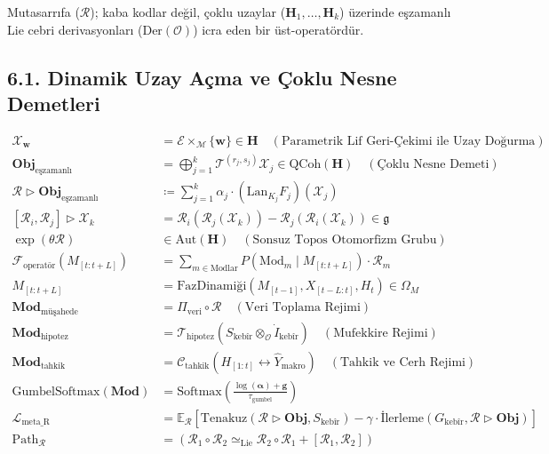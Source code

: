 \documentclass[11pt, a4paper]{article}
\begin{document}
Mutasarrıfa ($\mathcal{R}$); kaba kodlar değil, çoklu uzaylar ($\mathbf{H}_1, \dots, \mathbf{H}_k$) üzerinde eşzamanlı Lie cebri derivasyonları ($\text{Der}(\mathcal{O})$) icra eden bir üst-operatördür.

\subsection{6.1. Dinamik Uzay Açma ve Çoklu Nesne Demetleri}
\begin{align}
\mathcal{X}_{\mathbf{w}} &= \mathcal{E} \times_{\mathcal{M}} \{\mathbf{w}\} \in \mathbf{H} \quad (\text{Parametrik Lif Geri-Çekimi ile Uzay Doğurma}) \\
\mathbf{Obj}_{\text{eşzamanlı}} &= \bigoplus_{j=1}^k \mathcal{T}^{(r_j, s_j)} \mathcal{X}_j \in \text{QCoh}(\mathbf{H}) \quad (\text{Çoklu Nesne Demeti}) \\
\mathcal{R} \triangleright \mathbf{Obj}_{\text{eşzamanlı}} &\coloneqq \sum_{j=1}^k \alpha_j \cdot \left( \text{Lan}_{K_j} F_j \right)(\mathcal{X}_j) \\
[\mathcal{R}_i, \mathcal{R}_j] \triangleright \mathcal{X}_k &= \mathcal{R}_i(\mathcal{R}_j(\mathcal{X}_k)) - \mathcal{R}_j(\mathcal{R}_i(\mathcal{X}_k)) \in \mathfrak{g} \\
\exp(\theta \mathcal{R}) &\in \text{Aut}(\mathbf{H}) \quad (\text{Sonsuz Topos Otomorfizm Grubu}) \\
\mathcal{F}_{\text{operatör}}(M_{[t:t+L]}) &= \sum_{m \in \text{Modlar}} P(\text{Mod}_m \mid M_{[t:t+L]}) \cdot \mathcal{R}_m \\
M_{[t:t+L]} &= \text{FazDinamiği}(M_{[t-1]}, X_{[t-L:t]}, H_t) \in \Omega_M \\
\mathbf{Mod}_{\text{müşahede}} &= \Pi_{\text{veri}} \circ \mathcal{R} \quad (\text{Veri Toplama Rejimi}) \\
\mathbf{Mod}_{\text{hipotez}} &= \mathcal{T}_{\text{hipotez}}(S_{\text{kebîr}} \otimes_{\mathcal{O}} \dot{I}_{\text{kebîr}}) \quad (\text{Mufekkire Rejimi}) \\
\mathbf{Mod}_{\text{tahkik}} &= \mathcal{C}_{\text{tahkik}}(H_{[1:t]} \leftrightarrow \hat{Y}_{\text{makro}}) \quad (\text{Tahkik ve Cerh Rejimi}) \\
\text{GumbelSoftmax}(\mathbf{Mod}) &= \text{Softmax}\left( \frac{\log(\bm{\alpha}) + \mathbf{g}}{\tau_{\text{gumbel}}} \right) \\
\mathcal{L}_{\text{meta\_R}} &= \mathbb{E}_{\mathcal{R}} \left[ \text{Tenakuz}(\mathcal{R} \triangleright \mathbf{Obj}, S_{\text{kebîr}}) - \gamma \cdot \text{İlerleme}(G_{\text{kebîr}}, \mathcal{R} \triangleright \mathbf{Obj}) \right] \\
\text{Path}_{\mathcal{R}} &= (\mathcal{R}_1 \circ \mathcal{R}_2 \simeq_{\text{Lie}} \mathcal{R}_2 \circ \mathcal{R}_1 + [\mathcal{R}_1, \mathcal{R}_2])
\end{align}
\end{document}
